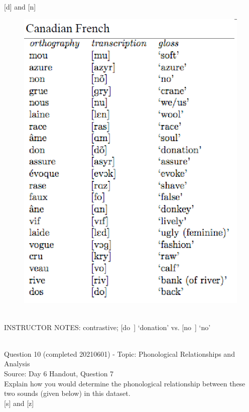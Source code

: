 \documentclass[12pt]{article}
\begin{document}
{[d]} and {[n]}

\begin{figure}[H]
\includegraphics{../images/canadianfrench.png}
\end{figure}

~\\
INSTRUCTOR NOTES: contrastive; [do~] ‘donation’ vs. [no~] ‘no’


~\\

{\large Question 10} (completed 20210601) - Topic: Phonological Relationships and Analysis\\
Source: Day 6 Handout, Question 7\\

Explain how you would determine the phonological relationship between these two sounds (given below) in this dataset.\\

{[s]} and {[z]}
\end{document}
